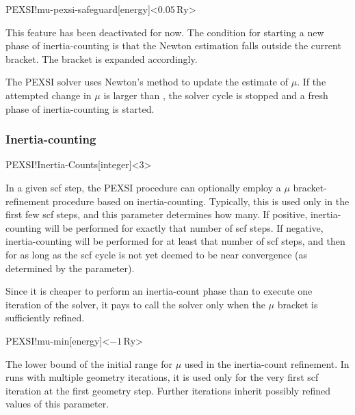 \begin{fdfentry}{PEXSI!mu-pexsi-safeguard}[energy]<$0.05\,\mathrm{Ry}$>

  \note This feature has been deactivated for now. The condition for
  starting a new phase of inertia-counting is that the Newton
  estimation falls outside the current bracket. The bracket is
  expanded accordingly.
        
  The PEXSI solver uses Newton's method to update the estimate of
  $\mu$.  If the attempted change in $\mu$ is larger than
  , the solver cycle is stopped and a
  fresh phase of inertia-counting is started.

\end{fdfentry}

\subsubsection{Inertia-counting}


\begin{fdfentry}{PEXSI!Inertia-Counts}[integer]<3>

  In a given scf step, the PEXSI procedure can optionally employ a
  $\mu$ bracket-refinement procedure based on
  inertia-counting. Typically, this is used only in the first few scf
  steps, and this parameter determines how many. If positive,
  inertia-counting will be performed for exactly that number of scf
  steps. If negative, inertia-counting will be performed for at least
  that number of scf steps, and then for as long as the scf cycle is
  not yet deemed to be near convergence (as determined by the
   parameter).

  \note Since it is cheaper to perform an inertia-count phase than to
  execute one iteration of the solver, it pays to call the solver only
  when the $\mu$ bracket is sufficiently refined.

\end{fdfentry}

\begin{fdfentry}{PEXSI!mu-min}[energy]<$-1\,\mathrm{Ry}$>

  The lower bound of the initial range for $\mu$ used in the
  inertia-count refinement. In runs with multiple geometry iterations,
  it is used only for the very first scf iteration at the first
  geometry step. Further iterations inherit possibly refined values of
  this parameter.

\end{fdfentry}


